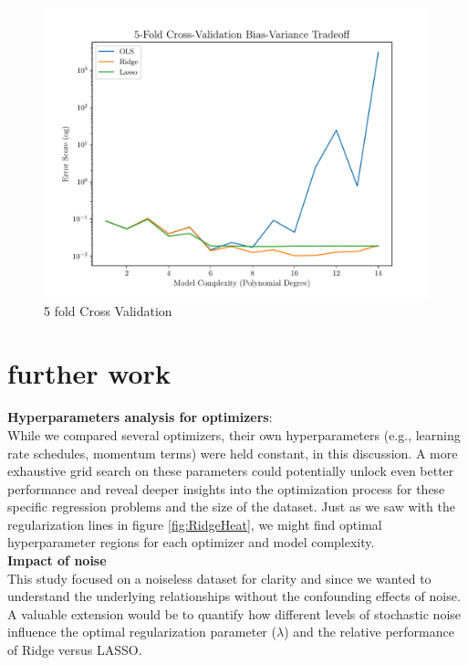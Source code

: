 \documentclass[twocolumn,aps]{revtex4}
\begin{document}
\begin{figure}[h]
    \centering
    \includegraphics[width=.95 \linewidth]{Figures/Cross_Validation.pdf}
    \caption{5 fold Cross Validation}
    \label{fig:CrossValidation}
\end{figure}

\section{further work}

\textbf{Hyperparameters analysis for optimizers}:
\\
While we compared several optimizers, their own hyperparameters (e.g., learning rate schedules, momentum terms) were held constant, in this discussion.
A more exhaustive grid search on these parameters could potentially unlock even better performance and reveal deeper insights into the optimization process for these specific regression problems and the size of the dataset.
Just as we saw with the regularization lines in figure \ref{fig:RidgeHeat}, we might find optimal hyperparameter regions for each optimizer and model complexity.
\\

\textbf{Impact of noise}
\\
This study focused on a noiseless dataset for clarity and since we wanted to understand the underlying relationships without the confounding effects of noise.
A valuable extension would be to quantify how different levels of stochastic noise influence the optimal regularization parameter ($\lambda$) and the relative performance of Ridge versus LASSO. 
\\
\end{document}
